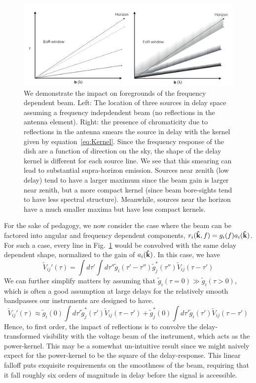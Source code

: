 \documentclass[onecolumn]{emulateapj}
\begin{document}
\begin{figure}[h!]
\includegraphics[width=\textwidth]{figures/wedgeCompare.pdf}
\caption{We demonstrate the impact on foregrounds of the frequency dependent beam. Left: The location of three sources in delay space assuming a frequency indepdendent beam (no reflections in the antenna element). Right: the presence of chromaticity due to reflections in the antenna smears the source in delay with the kernel given by equation~\ref{eq:Kernel}. Since the frequency response of the dish are a function of direction on the sky, the shape of the delay kernel is different for each source line. We see that this smearing can lead to substantial supra-horizon emission. Sources near zenith (low delay) tend to have a larger maximum since the beam gain is larger near zenith, but a more compact kernel (since beam bore-sights tend to have less spectral structure). Meanwhile, sources near the horizon have a much smaller maxima but have less compact kernels.}
\label{fig:Smearing}
\end{figure}
For the sake of pedagogy, we now consider the case where the beam can be factored into angular and frequency dependent components, $r_i({\bf \hat{k}},f) = g_i(f)a_i({\bf \hat{k}})$. For such a case, every line in Fig.~\ref{fig:Smearing} would be convolved with the same delay dependent shape, normalized to the gain of $a_i({\bf \hat{k}})$. In this case, we have
\begin{equation}
\widetilde{V}_{ij}'(\tau) = \int d\tau' \int d \tau'' \widetilde{g}_i(\tau' - \tau'')\widetilde{g}^*_j(\tau'') \widetilde{V}_{ij}(\tau-\tau')
\end{equation}
We can further simplify matters by assuming that $\widetilde{g}_i(\tau=0)\gg\widetilde{g}_i(\tau>0)$, which is often a good assumption at large delays for the relatively smooth bandpasses our instruments are designed to have. 
\begin{equation}\label{eq:KernelApprox}
\widetilde{V}_{ij}'(\tau) \approx \widetilde{g}_i(0)\int d \tau' \widetilde{g}_j^*(\tau')\widetilde{V}_{ij}(\tau- \tau') + \widetilde{g}_j^*(0) \int d \tau' \widetilde{g}_i(\tau')\widetilde{V}_{ij}(\tau-\tau') 
\end{equation}
Hence, to first order, the impact of reflections is to convolve the delay-transformed visibility with the voltage beam of the instrument, which acts as the power-kernel. This may be a somewhat un-intuitive result since we might naively expect for the power-kernel to be the square of the delay-response. This linear falloff puts exquisite requirements on the smoothness of the beam, requiring that it fall roughly six orders of magnitude in delay before the signal is accessible. 
\end{document}
